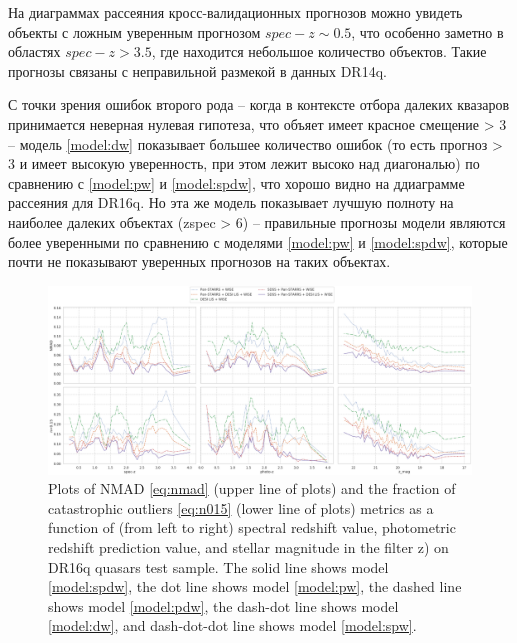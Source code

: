 \documentclass[fleqn,usenatbib]{mnras}
\begin{document}
На диаграммах рассеяния кросс-валидационных прогнозов можно увидеть объекты с ложным уверенным прогнозом $spec-z \sim 0.5$, что особенно заметно в областях $spec-z > 3.5$, где находится небольшое количество объектов. Такие прогнозы связаны с неправильной размекой в данных DR14q.

С точки зрения ошибок второго рода -- когда в контексте отбора далеких квазаров принимается неверная нулевая гипотеза, что объяет имеет красное смещение > 3 -- модель \ref{model:dw} показывает большее количество ошибок (то есть прогноз > 3 и имеет высокую уверенность, при этом лежит высоко над диагональю) по сравнению с \ref{model:pw} и \ref{model:spdw}, что хорошо видно на ддиаграмме рассеяния для DR16q. Но эта же модель показывает лучшую полноту на наиболее далеких объектах (zspec > 6) -- правильные прогнозы модели являются более уверенными по сравнению с моделями \ref{model:pw} и \ref{model:spdw}, которые почти не показывают уверенных прогнозов на таких объектах.

\begin{figure}
    \centering
    \includegraphics[width=0.99\linewidth]{images/metrics-dr16q-ab-mini.png}
    \caption{Plots of NMAD \eqref{eq:nmad} (upper line of plots) and the fraction of catastrophic outliers \eqref{eq:n015} (lower line of plots) metrics as a function of (from left to right) spectral redshift value, photometric redshift prediction value, and stellar magnitude in the filter z) on DR16q quasars test sample. The solid line shows model \ref{model:spdw}, the dot line shows model \ref{model:pw}, the dashed line shows model \ref{model:pdw}, the dash-dot line shows model \ref{model:dw}, and dash-dot-dot line shows model \ref{model:spw}.}
    \label{fig:metrics-dr16q}
\end{figure}
\end{document}
